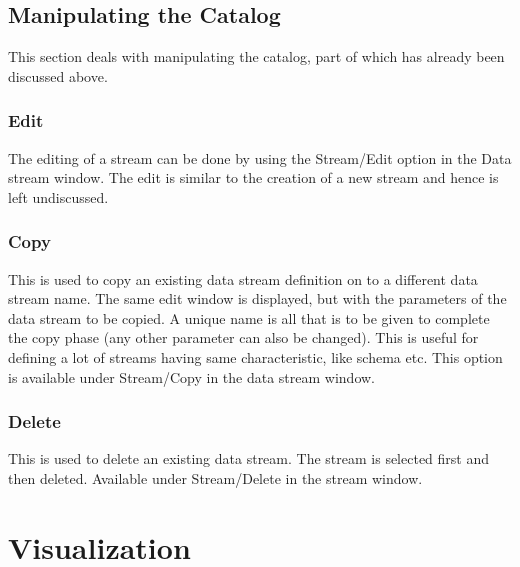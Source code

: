 
\subsection{Manipulating the Catalog}

This section deals with manipulating the catalog, part of which has already been
discussed above.


\subsubsection{Edit}

The editing of a stream can be done by using the Stream/Edit option in the Data
stream window. The edit is similar to the creation of a new stream and hence is
left undiscussed.

\subsubsection{Copy}

This is used to copy an existing data stream definition on to a different data
stream name. The same edit window is displayed, but with the parameters of the
data stream to be copied. A unique name is all that is to be given to complete
the copy phase (any other parameter can also be changed). This is useful for
defining a lot of streams having same characteristic, like schema etc. This
option is available under Stream/Copy in the data stream window.

\subsubsection{Delete}

This is used to delete an existing data stream. The stream is selected first and
then deleted. Available under Stream/Delete in the stream window.


\section{Visualization}
\label{sect:visualization}

